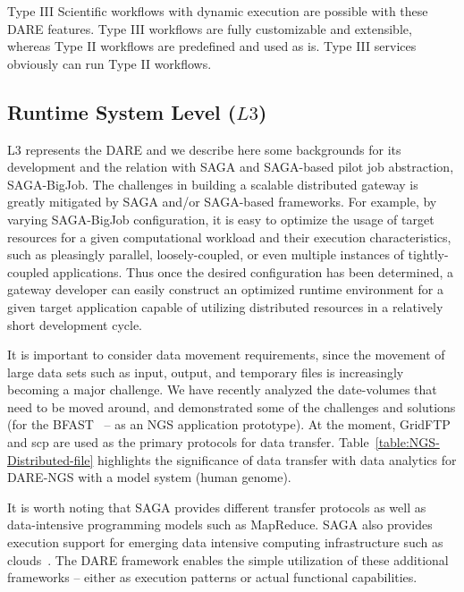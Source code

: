 \documentclass[]{svjour3}
\begin{document}
Type III Scientific workflows with dynamic execution are possible with
these DARE features. Type III workflows are fully customizable and
extensible, whereas Type II workflows are predefined and used as is.
Type III services obviously can run Type II workflows.


\subsection{Runtime System Level ($L3$)}
L3 represents the DARE and we describe here some backgrounds for its
development and the relation with SAGA and SAGA-based pilot job
abstraction, SAGA-BigJob. The challenges in building a scalable
distributed gateway is greatly mitigated by SAGA and/or SAGA-based
frameworks. For example, by varying SAGA-BigJob configuration, it is
easy to optimize the usage of target resources for a given
computational workload and their execution characteristics, such as
pleasingly parallel, loosely-coupled, or even multiple instances of
tightly-coupled applications. Thus once the desired configuration
 has been determined, a gateway developer can easily
construct an optimized runtime environment for a given target
application capable of utilizing distributed resources in a relatively
short development cycle.

It is important to consider data movement requirements, since the
movement of large data sets such as input, output, and temporary files
is increasingly becoming a major challenge. We have recently analyzed
the date-volumes that need to be moved around, and demonstrated some
of the challenges and solutions (for the BFAST~\cite{ecmls11} -- as an
NGS application prototype). At the moment, GridFTP and scp are used as
the primary protocols for data
transfer. Table~\ref{table:NGS-Distributed-file} highlights the
significance of data transfer with data analytics for DARE-NGS with a
model system (human genome).

It is worth noting that SAGA provides different transfer protocols as
well as data-intensive programming models such as MapReduce. SAGA also
provides execution support for emerging data intensive computing
infrastructure such as clouds~\cite{abstractions-azure,saga-ccgrid10}.
The DARE framework enables the simple utilization of these additional
frameworks -- either as execution patterns or actual functional
capabilities.
\end{document}
